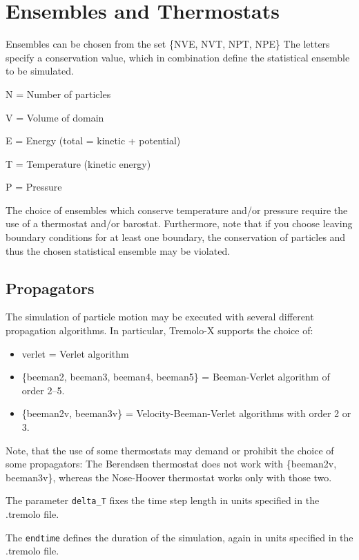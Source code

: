 \chapter{Ensembles and Thermostats}
\label{ensembles}

Ensembles can be chosen from the set \{NVE, NVT, NPT, NPE\} 
The letters specify a conservation value, which in combination define the statistical ensemble to be simulated.

N = Number of particles

V = Volume of domain

E = Energy (total = kinetic + potential)

T = Temperature (kinetic energy)

P = Pressure

The choice of ensembles which conserve temperature and/or pressure require the use of a thermostat and/or barostat.
Furthermore, note that if you choose leaving boundary conditions for at least one boundary, the conservation of particles and thus the chosen statistical ensemble may be violated.

\section{Propagators}
\label{propagator}

The simulation of particle motion may be executed with several different propagation algorithms.
In particular, Tremolo-X supports the choice of:

\begin{itemize}
 \item verlet = Verlet algorithm
 \item \{beeman2, beeman3, beeman4, beeman5\} = Beeman-Verlet algorithm of order 2--5.
 \item \{beeman2v, beeman3v\} = Velocity-Beeman-Verlet algorithms with order 2 or 3.\\
\end{itemize}

Note, that the use of some thermostats may demand or prohibit the choice of some propagators:
The Berendsen thermostat does not work with \{beeman2v, beeman3v\}, whereas the Nose-Hoover thermostat works only with those two.

The parameter \texttt{delta\_T} fixes the time step length in units specified in the .tremolo file.

The \texttt{endtime} defines the duration of the simulation, again in units specified in the .tremolo file.

